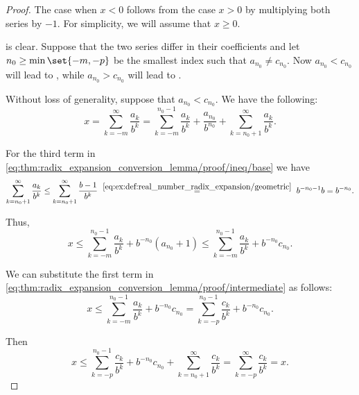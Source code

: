 \begin{proof}
  The case when \( x < 0 \) follows from the case \( x > 0 \) by multiplying both series by \( -1 \). For simplicity, we will assume that \( x \geq 0 \).

   is clear. Suppose that the two series differ in their coefficients and let \( n_0 \geq \min\set{ -m, -p } \) be the smallest index such that \( a_{n_0} \neq c_{n_0} \). Now \( a_{n_0} < c_{n_0} \) will lead to , while \( a_{n_0} > c_{n_0} \) will lead to .

  Without loss of generality, suppose that \( a_{n_0} < c_{n_0} \). We have the following:
  \begin{equation}\label{eq:thm:radix_expansion_conversion_lemma/proof/ineq/base}
    x
    =
    \sum_{k=-m}^\infty \frac {a_k} {b^k}
    =
    \sum_{k=-m}^{n_0 - 1} \frac {a_k} {b^k} + \frac {a_{n_0}} {b^{n_0}} + \sum_{k=n_0+1}^\infty \frac {a_k} {b^k}.
  \end{equation}

  For the third term in \eqref{eq:thm:radix_expansion_conversion_lemma/proof/ineq/base} we have
  \begin{equation}\label{eq:thm:radix_expansion_conversion_lemma/proof/third_term}
    \sum_{k=n_0+1}^\infty \frac {a_k} {b^k}
    \leq
    \sum_{k=n_0+1}^\infty \frac {b - 1} {b^k}
    \reloset {\eqref{eq:ex:def:real_number_radix_expansion/geometric}} =
    b^{-n_0-1} b
    =
    b^{-n_0}.
  \end{equation}

  Thus,
  \begin{equation}\label{eq:thm:radix_expansion_conversion_lemma/proof/ineq/intermediate}
    x
    \leq
    \sum_{k=-m}^{n_0 - 1} \frac {a_k} {b^k} + b^{-n_0} (a_{n_0} + 1)
    \leq
    \sum_{k=-m}^{n_0 - 1} \frac {a_k} {b^k} + b^{-n_0} c_{n_0}.
  \end{equation}

  We can substitute the first term in \eqref{eq:thm:radix_expansion_conversion_lemma/proof/intermediate} as follows:
  \begin{equation*}
    x
    \leq
    \sum_{k=-m}^{n_0 - 1} \frac {a_k} {b^k} + b^{-n_0} c_{n_0}
    =
    \sum_{k=-p}^{n_0 - 1} \frac {c_k} {b^k} + b^{-n_0} c_{n_0}.
  \end{equation*}

  Then
  \begin{equation}\label{eq:thm:radix_expansion_conversion_lemma/proof/ineq/final}
    x
    \leq
    \sum_{k=-p}^{n_0 - 1} \frac {c_k} {b^k} + b^{-n_0} c_{n_0} + \sum_{k=n_0+1}^\infty \frac {c_k} {b^k}
    =
    \sum_{k=-p}^\infty \frac {c_k} {b^k}
    =
    x.
  \end{equation}


\end{proof}
